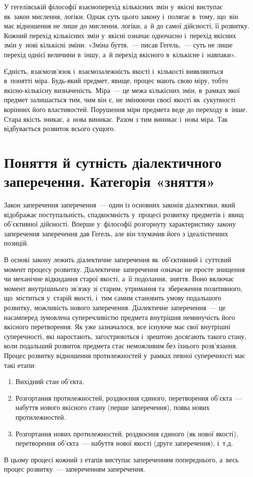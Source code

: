 \documentclass[a5paper,oneside,DIV=12,12pt,headings=small]{scrartcl}
\begin{document}
		У гегелівській філософії взаємоперехід кількісних змін у~якісні виступає як~закон мислення, логіки. Однак суть цього закону і~полягає в~тому, що~він має відношення не лише до мислення, логіки, а~й до самої дійсності, її розвитку. Кожний перехід кількісних змін у~якісні означає одночасно і~перехід якісних змін у~нові кількісні зміни. «Зміна буття,~— писав Гегель,~— суть не лише перехід однієї величини в~іншу, а~й перехід якісного в~кількісне і~навпаки».
		
		Єдність, взаємозв'язок і~взаємозалежність якості і~кількості виявляються в~понятті міра. Будь-який предмет, явище, процес мають свою міру, тобто якісно-кількісну визначеність. Міра~— це межа кількісних змін, в~рамках якої предмет залишається тим, чим він є, не змінюючи своєї якості як~сукупності корінних його властивостей. Порушення міри предмета веде до переходу в~інше. Стара якість зникає, а~нова виникає. Разом з тим виникає і~нова міра. Так відбувається розвиток всього сущого.
		
	\section{Поняття й сутність діалектичного заперечення. Категорія «зняття»}
		Закон заперечення заперечення~— один із основних законів діалектики, який відображає поступальність, спадкоємність у~процесі розвитку предметів і~явищ об'єктивної дійсності. Вперше у~філософії розгорнуту характеристику закону заперечення заперечення дав Гегель, але він тлумачив його з ідеалістичних позицій.

		В основі закону лежить діалектичне заперечення як~об'\-єк\-тив\-ний і~суттєвий момент процесу розвитку. Діалектичне заперечення означає не просте знищення чи механічне відкидання старої якості, а~її подолання, зняття. Воно включає момент внутрішнього зв'язку зі старим, утримання та~збереження позитивного, що~міститься у~старій якості, і~тим самим становить умову подальшого розвитку, можливість нового заперечення. Діалектичне заперечення~— це насамперед зумовлена суперечливістю предмета внутрішня неминучість його якісного перетворення. Як уже зазначалося, все існуюче має свої внутрішні суперечності, які наростають, загострюються і~зрештою досягають такого стану, коли подальший розвиток предмета стає неможливим без їхнього розв'язання. Процес розвитку відношення протилежностей у~рамках певної суперечності має такі етапи:
		\begin{enumerate}
			\item Вихідний стан об'єкта.
			\item Розгортання протилежностей, роздвоєння єдиного, перетворення об'єкта~— набуття нового якісного стану (перше заперечення), поява нових протилежностей.
			\item Розгортання нових протилежностей, роздвоєння єдиного (як нової якості), перетворення об'єкта~— набуття нової якості (друге заперечення), і~т.д.
		\end{enumerate}
		В цьому процесі кожний з етапів виступає запереченням попереднього, а~весь процес розвитку~— запереченням заперечення.
		
\end{document}
